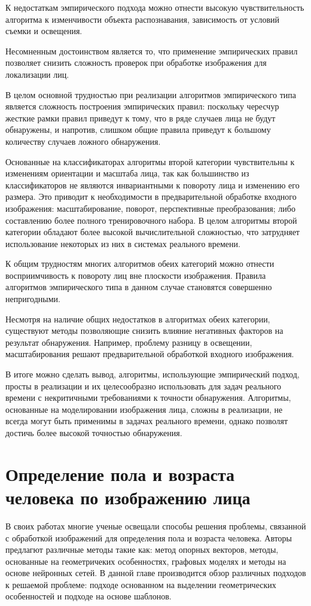 К недостаткам эмпирического подхода можно отнести высокую чувствительность
алгоритма к изменчивости объекта распознавания, зависимость от условий съемки и
освещения.

Несомненным достоинством является то, что применение эмпирических правил
позволяет снизить сложность проверок при обработке изображения для локализации
лиц.

В целом основной трудностью при реализации алгоритмов эмпирического типа
является сложность построения эмпирических правил: поскольку чересчур жесткие
рамки правил приведут к тому, что в ряде случаев лица не будут обнаружены, и
напротив, слишком общие правила приведут к большому количеству случаев ложного
обнаружения. 

Основанные на классификаторах алгоритмы второй категории чувствительны к
изменениям ориентации и масштаба лица, так как большинство из классификаторов
не являются инвариантными к повороту лица и изменению его размера. Это приводит
к необходимости в предварительной обработке входного изображения:
масштабирование, поворот, перспективные преобразования; либо составлению более
полного тренировочного набора. В целом алгоритмы второй категории обладают
более высокой вычислительной сложностью, что затрудняет использование некоторых
из них в системах реального времени.


К общим трудностям многих алгоритмов обеих категорий можно отнести
восприимчивость к повороту лиц вне плоскости изображения. Правила алгоритмов
эмпирического типа в данном случае становятся совершенно непригодными.

Несмотря на наличие общих недостатков в алгоритмах обеих категории, существуют
методы позволяющие снизить влияние негативных факторов на результат
обнаружения. Например, проблему разницу в освещении, масштабирования решают
предварительной обработкой входного изображения.

В итоге можно сделать вывод, алгоритмы, использующие эмпирический подход,
просты в реализации и их целесообразно использовать для задач реального времени
с некритичными требованиями к точности обнаружения. Алгоритмы, основанные на
моделировании изображения лица, сложны в реализации, не всегда могут быть
применимы в задачах реального времени, однако позволят достичь более
высокой точностью обнаружения.

\section{Определение пола и возраста человека по изображению лица}
В своих работах многие ученые освещали способы решения проблемы, связанной с
обработкой изображений для определения пола и возраста человека. Авторы
предлагют различные методы такие как: метод опорных векторов, методы, основанные
на геометричеких особенностях, графовых моделях и методы на основе нейронных
сетей. В данной главе производится обзор различных подходов к решаемой проблеме:
подходе основанном на выделении геометрических особенностей и подходе на основе
шаблонов.


